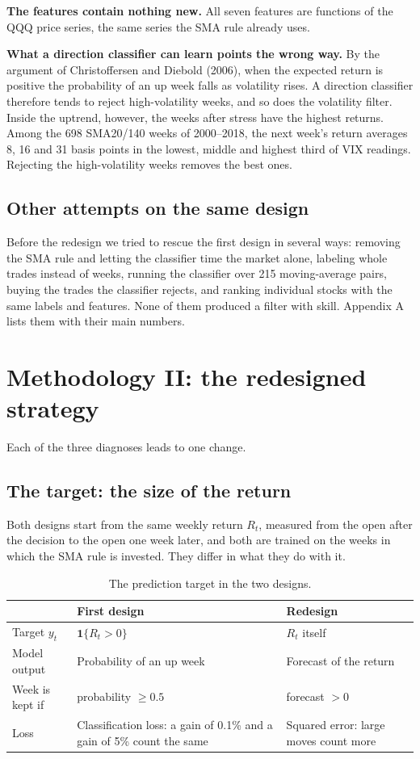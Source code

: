 \documentclass[11pt]{article}
\begin{document}
\textbf{The features contain nothing new.} All seven features are functions of the QQQ price series, the same series the SMA rule already uses.

\textbf{What a direction classifier can learn points the wrong way.} By the argument of Christoffersen and Diebold (2006), when the expected return is positive the probability of an up week falls as volatility rises. A direction classifier therefore tends to reject high-volatility weeks, and so does the volatility filter. Inside the uptrend, however, the weeks after stress have the highest returns. Among the 698 SMA20/140 weeks of 2000--2018, the next week's return averages 8, 16 and 31 basis points in the lowest, middle and highest third of VIX readings. Rejecting the high-volatility weeks removes the best ones.

\subsection{Other attempts on the same design}

Before the redesign we tried to rescue the first design in several ways: removing the SMA rule and letting the classifier time the market alone, labeling whole trades instead of weeks, running the classifier over 215 moving-average pairs, buying the trades the classifier rejects, and ranking individual stocks with the same labels and features. None of them produced a filter with skill. Appendix A lists them with their main numbers.

\section{Methodology II: the redesigned strategy}

Each of the three diagnoses leads to one change.

\subsection{The target: the size of the return}

Both designs start from the same weekly return \(R_t\), measured from the open after the decision to the open one week later, and both are trained on the weeks in which the SMA rule is invested. They differ in what they do with it.

\begin{table}[H]
\centering\small
\caption{The prediction target in the two designs.}
\label{tab:target}
\begin{tabularx}{\textwidth}{@{}lXX@{}}
\toprule
 & First design & Redesign \\
\midrule
Target $y_t$ & $\mathbf{1}\{R_t > 0\}$ & $R_t$ itself \\
Model output & Probability of an up week & Forecast of the return \\
Week is kept if & probability $\ge 0.5$ & forecast $> 0$ \\
Loss & Classification loss: a gain of 0.1\% and a gain of 5\% count the same & Squared error: large moves count more \\
\bottomrule
\end{tabularx}
\end{table}
\end{document}
